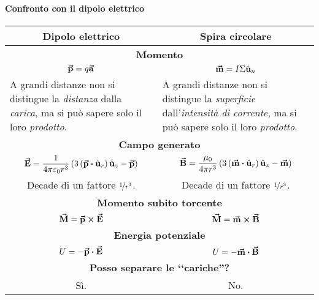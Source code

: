 \paragraph{Confronto con il dipolo elettrico}
\begin{center}
	\begin{tabular}{p{}p{}}
		\multicolumn{1}{c|}{\textbf{Dipolo elettrico}} &
		\multicolumn{1}{c}{\textbf{Spira circolare}} \\ \hline
				\multicolumn{2}{c}{\textbf{Momento}}\\\hline
				\multicolumn{1}{c|}{$\displaystyle\vb*{\va{p}}=q\vb*{\va{a}}$} & \multicolumn{1}{c}{$\displaystyle\vb*{\va{m}}=I\Sigma\hat{\mathbf{u}}_n$}\\
				\multicolumn{1}{p{0.49\textwidth}|}{A grandi distanze non si distingue la \textit{distanza} dalla \textit{carica}, ma si può sapere solo il loro \textit{prodotto}.} & 
				A grandi distanze non si distingue la \textit{superficie} dall'\textit{intensità di corrente}, ma si può sapere solo il loro \textit{prodotto}.
				\\ \hline
				\multicolumn{2}{c}{\textbf{Campo generato}}\\\hline
				\multicolumn{1}{c|}{
					$\displaystyle\vba{E}=\frac{1}{4\pi\epsilon_0r^3}\left(3\left(\vba{p}\vdot\vbh{u}_r\right)\vbh{u}_z-\vba{p}\right)$
				} &
				\multicolumn{1}{c}{
					$\displaystyle\vba{B}=\frac{\mu_0}{4\pi r^3}\left(3\left(\vba{m}\vdot\vbh{u}_r\right)\vbh{u}_z-\vba{m}\right)$
				}\\
				\multicolumn{1}{c|}{Decade di un fattore $\nicefrac{1}{r^3}$.} & 
				\multicolumn{1}{c}{Decade di un fattore $\nicefrac{1}{r^3}$.}
				\\ \hline
				\multicolumn{2}{c}{\textbf{Momento subito torcente}}\\\hline
				\multicolumn{1}{c|}{
					$\displaystyle\vb*{\va{M}}=\vb*{\va{p}}\cross\vb*{\va{E}}$
				} &
				\multicolumn{1}{c}{
					$\displaystyle\vb*{\va{M}}=\vb*{\va{m}}\cross\vb*{\va{B}}$
				}\\ \hline
				\multicolumn{2}{c}{\textbf{Energia potenziale}}\\\hline
				\multicolumn{1}{c|}{
					$\displaystyle U=-\vba{p}\vdot\vba{E}$
				} &
				\multicolumn{1}{c}{
					$\displaystyle U=-\vba{m}\vdot\vba{B}$
				}\\ \hline
				\multicolumn{2}{c}{\textbf{Posso separare le ‘‘cariche''?}}\\\hline
				\multicolumn{1}{c|}{
					Sì.
				} &
				\multicolumn{1}{c}{
					No.
				}\\ \hline
			\end{tabular}
		\end{center}
